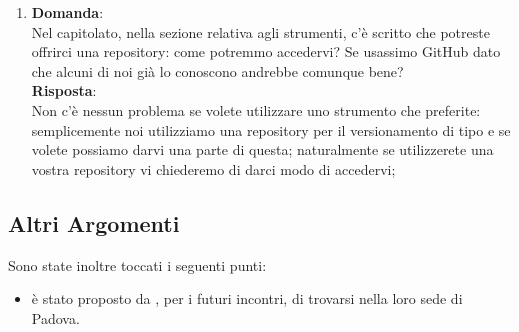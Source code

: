 \documentclass[a4paper,titlepage]{article}
\begin{document}
\begin{enumerate}
  \item \textbf{Domanda}:\\
  Nel capitolato, nella sezione relativa agli strumenti, c'è scritto che potreste offrirci una repository: come potremmo accedervi? Se usassimo GitHub dato che alcuni di noi già lo conoscono andrebbe comunque bene?\\
  \textbf{Risposta}: \\
  Non c'è nessun problema se volete utilizzare uno strumento che preferite: semplicemente noi utilizziamo una repository per il versionamento di tipo  e se volete possiamo darvi una parte di questa; naturalmente se utilizzerete una vostra repository vi chiederemo di darci modo di accedervi;
\end{enumerate}

\subsection{Altri Argomenti}
\label{sub:AltriArgomenti}

Sono state inoltre toccati i seguenti punti:

\begin{itemize}
  \item è stato proposto da \PROPONENTE, per i futuri incontri, di trovarsi nella loro sede di Padova.
\end{itemize}
\end{document}
